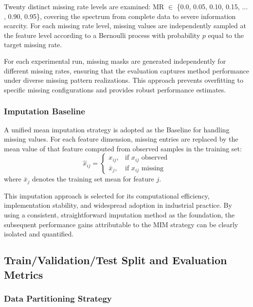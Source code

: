 \documentclass[5p,times]{elsarticle}
\begin{document}
Twenty distinct missing rate levels are examined: MR $\in$ \{0.0, 0.05, 0.10, 0.15, $\ldots$, 0.90, 0.95\}, covering the spectrum from complete data to severe information scarcity. For each missing rate level, missing values are independently sampled at the feature level according to a Bernoulli process with probability $p$ equal to the target missing rate.

For each experimental run, missing masks are generated independently for different missing rates, ensuring that the evaluation captures method performance under diverse missing pattern realizations. This approach prevents overfitting to specific missing configurations and provides robust performance estimates.

\subsubsection{Imputation Baseline}

A unified mean imputation strategy is adopted as the Baseline for handling missing values. For each feature dimension, missing entries are replaced by the mean value of that feature computed from observed samples in the training set:
\begin{equation}
    \hat{x}_{ij} = \begin{cases}
        x_{ij}, & \text{if } x_{ij} \text{ observed} \\
        \bar{x}_j, & \text{if } x_{ij} \text{ missing}
    \end{cases}
\end{equation}
where $\bar{x}_j$ denotes the training set mean for feature $j$.

This imputation approach is selected for its computational efficiency, implementation stability, and widespread adoption in industrial practice. By using a consistent, straightforward imputation method as the foundation, the subsequent performance gains attributable to the MIM strategy can be clearly isolated and quantified.

\subsection{Train/Validation/Test Split and Evaluation Metrics}\label{sec:evaluation}

\subsubsection{Data Partitioning Strategy}
\end{document}
